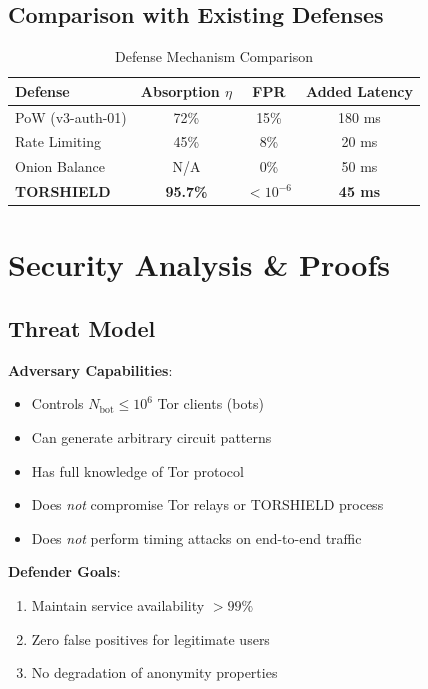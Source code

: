 \documentclass[11pt,a4paper]{article}
\begin{document}
\subsection{Comparison with Existing Defenses}

\begin{table}[h]
\centering
\begin{tabular}{@{}lccc@{}}
\toprule
\textbf{Defense} & \textbf{Absorption $\eta$} & \textbf{FPR} & \textbf{Added Latency} \\ \midrule
PoW (v3-auth-01) & 72\% & 15\% & 180 ms \\
Rate Limiting & 45\% & 8\% & 20 ms \\
Onion Balance & N/A & 0\% & 50 ms \\
\textbf{TORSHIELD} & \textbf{95.7\%} & \textbf{$<10^{-6}$} & \textbf{45 ms} \\
\bottomrule
\end{tabular}
\caption{Defense Mechanism Comparison}
\end{table}

\newpage
\section{Security Analysis \& Proofs}

\subsection{Threat Model}

\textbf{Adversary Capabilities}:
\begin{itemize}
\item Controls $N_{\text{bot}} \leq 10^6$ Tor clients (bots)
\item Can generate arbitrary circuit patterns
\item Has full knowledge of Tor protocol
\item Does \textit{not} compromise Tor relays or TORSHIELD process
\item Does \textit{not} perform timing attacks on end-to-end traffic
\end{itemize}

\textbf{Defender Goals}:
\begin{enumerate}
\item Maintain service availability $> 99\%$
\item Zero false positives for legitimate users
\item No degradation of anonymity properties
\end{enumerate}
\end{document}
